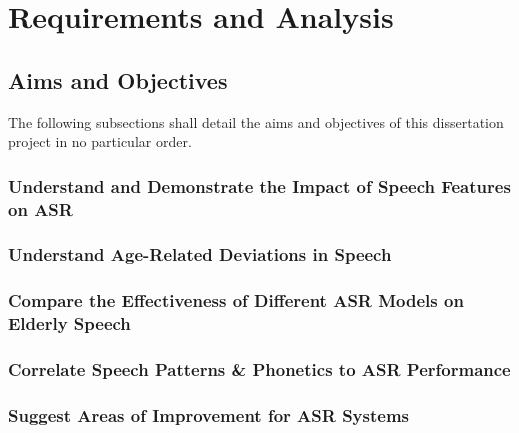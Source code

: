 \chapter{Requirements and Analysis}\label{ch:requirements-and-analysis}

\section{Aims and Objectives}\label{sec:aims-and-objectives2}

The following subsections shall detail the aims and objectives of this dissertation project in no
particular order.

\subsection{Understand and Demonstrate the Impact of Speech Features on ASR}\label{subsec:aim1}

\subsection{Understand Age-Related Deviations in Speech}\label{subsec:aim2}

\subsection{Compare the Effectiveness of Different ASR Models on Elderly Speech}\label{subsec:aim3}

\subsection{Correlate Speech Patterns \& Phonetics to ASR Performance}\label{subsec:aim4}

\subsection{Suggest Areas of Improvement for ASR Systems}\label{subsec:aim5}
